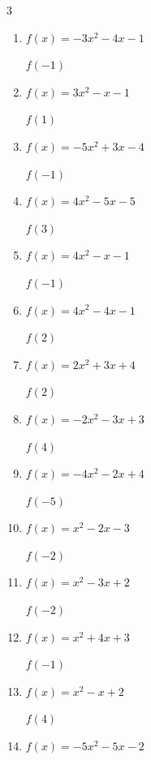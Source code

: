 \begin{multicols}{3}
\begin{enumerate}
$f(-5)$
        \phantom{$= 120$}

  \item $f(x)=-3x^{2}-4x-1$

$f(-1)$
        \phantom{$= 0$}

  \item $f(x)=3x^{2}-x-1$

$f(1)$
        \phantom{$= 1$}

  \item $f(x)=-5x^{2}+3x-4$

$f(-1)$
        \phantom{$= -12$}

  \item $f(x)=4x^{2}-5x-5$

$f(3)$
        \phantom{$= 16$}

  \item $f(x)=4x^{2}-x-1$

$f(-1)$
        \phantom{$= 4$}

  \item $f(x)=4x^{2}-4x-1$

$f(2)$
        \phantom{$= 7$}

  \item $f(x)=2x^{2}+3x+4$

$f(2)$
        \phantom{$= 18$}

  \item $f(x)=-2x^{2}-3x+3$

$f(4)$
        \phantom{$= -41$}

  \item $f(x)=-4x^{2}-2x+4$

$f(-5)$
        \phantom{$= -86$}

  \item $f(x)=x^{2}-2x-3$

$f(-2)$
        \phantom{$= 5$}

  \item $f(x)=x^{2}-3x+2$

$f(-2)$
        \phantom{$= 12$}

  \item $f(x)=x^{2}+4x+3$

$f(-1)$
        \phantom{$= 0$}

  \item $f(x)=x^{2}-x+2$

$f(4)$
        \phantom{$= 14$}

\columnbreak %

\resetques

  \item $f(x)=-5x^{2}-5x-2$


\end{enumerate}
\end{multicols}
